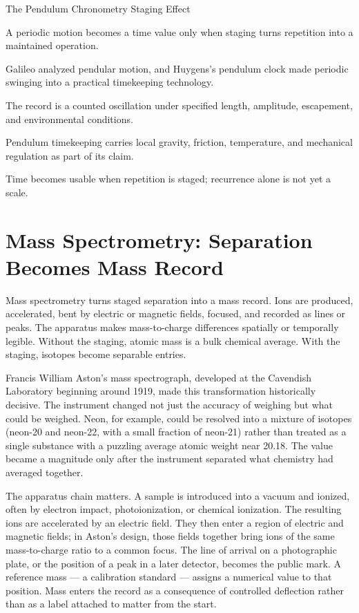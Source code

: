 \begin{phenom}{The Pendulum Chronometry Staging Effect~\cite{galileo1638,huygens1673}}
\label{ph:pendulum-chronometry}

\PhStatement
A periodic motion becomes a time value only when staging turns repetition into
a maintained operation.

\PhOrigin
Galileo analyzed pendular motion, and Huygens's pendulum clock made periodic
swinging into a practical timekeeping technology.

\PhObservation
The record is a counted oscillation under specified length, amplitude,
escapement, and environmental conditions.

\PhConstraint
Pendulum timekeeping carries local gravity, friction, temperature, and
mechanical regulation as part of its claim.

\PhConsequence
Time becomes usable when repetition is staged; recurrence alone is not yet a
scale.
\end{phenom}

\section{Mass Spectrometry: Separation Becomes Mass Record}

Mass spectrometry turns staged separation into a mass record. Ions are
produced, accelerated, bent by electric or magnetic fields, focused, and
recorded as lines or peaks. The apparatus makes mass-to-charge differences
spatially or temporally legible. Without the staging, atomic mass is a bulk
chemical average. With the staging, isotopes become separable entries.

Francis William Aston's mass spectrograph, developed at the Cavendish
Laboratory beginning around 1919, made this transformation historically
decisive. The instrument changed not just the accuracy of weighing but what
could be weighed. Neon, for example, could be resolved into a mixture of
isotopes (neon-20 and neon-22, with a small fraction of neon-21) rather than
treated as a single substance with a puzzling average atomic weight near
20.18. The value became a magnitude only after the instrument separated what
chemistry had averaged together.

The apparatus chain matters. A sample is introduced into a vacuum and
ionized, often by electron impact, photoionization, or chemical ionization.
The resulting ions are accelerated by an electric field. They then enter a
region of electric and magnetic fields; in Aston's design, those fields
together bring ions of the same mass-to-charge ratio to a common focus. The
line of arrival on a photographic plate, or the position of a peak in a
later detector, becomes the public mark. A reference mass --- a calibration
standard --- assigns a numerical value to that position. Mass enters the
record as a consequence of controlled deflection rather than as a label
attached to matter from the start.

